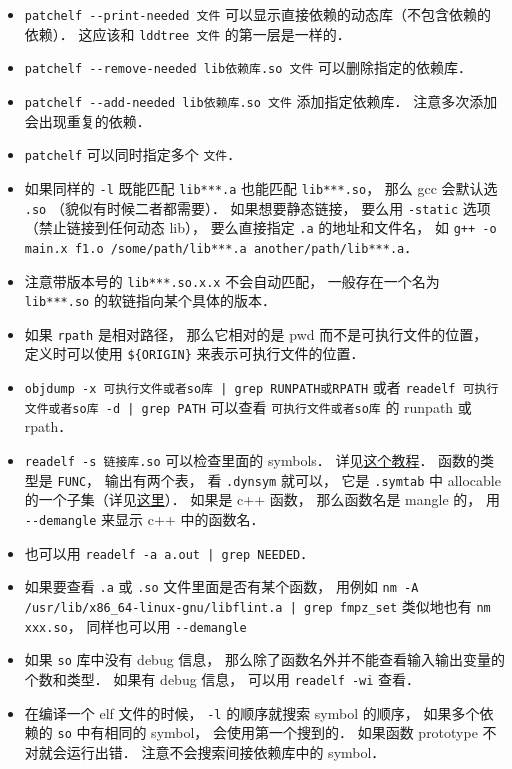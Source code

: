 \begin{itemize}
\item \verb|patchelf --print-needed 文件| 可以显示直接依赖的动态库（不包含依赖的依赖）． 这应该和 \verb|lddtree 文件| 的第一层是一样的．
\item \verb|patchelf --remove-needed lib依赖库.so 文件| 可以删除指定的依赖库．
\item \verb|patchelf --add-needed lib依赖库.so 文件| 添加指定依赖库． 注意多次添加会出现重复的依赖．
\item \verb|patchelf| 可以同时指定多个 \verb|文件|．
\item 如果同样的 \verb`-l` 既能匹配 \verb`lib***.a` 也能匹配 \verb`lib***.so`， 那么 gcc 会默认选 \verb`.so` （貌似有时候二者都需要）． 如果想要静态链接， 要么用 \verb`-static` 选项（禁止链接到任何动态 lib）， 要么直接指定 \verb`.a` 的地址和文件名， 如 \verb`g++ -o main.x f1.o /some/path/lib***.a another/path/lib***.a`．
\item 注意带版本号的 \verb|lib***.so.x.x| 不会自动匹配， 一般存在一个名为 \verb|lib***.so| 的软链指向某个具体的版本．
\item 如果 \verb|rpath| 是相对路径， 那么它相对的是 pwd 而不是可执行文件的位置， 定义时可以使用 \verb|${ORIGIN}| 来表示可执行文件的位置．
\item \verb`objdump -x 可执行文件或者so库 | grep RUNPATH或RPATH` 或者 \verb`readelf 可执行文件或者so库 -d | grep PATH` 可以查看 \verb|可执行文件或者so库| 的 runpath 或 rpath．
\item \verb|readelf -s 链接库.so| 可以检查里面的 symbols． 详见\href{https://amir.rachum.com/blog/2016/09/17/shared-libraries/}{这个教程}． 函数的类型是 \verb|FUNC|， 输出有两个表， 看 \verb|.dynsym| 就可以， 它是 \verb|.symtab| 中 allocable 的一个子集（详见\href{https://blogs.oracle.com/solaris/post/inside-elf-symbol-tables}{这里}）． 如果是 c++ 函数， 那么函数名是 mangle 的， 用 \verb|--demangle| 来显示 c++ 中的函数名．
\item 也可以用 \verb`readelf -a a.out | grep NEEDED`．
\item 如果要查看 \verb|.a| 或 \verb|.so| 文件里面是否有某个函数， 用例如 \verb`nm -A /usr/lib/x86_64-linux-gnu/libflint.a | grep fmpz_set` 类似地也有 \verb|nm xxx.so|， 同样也可以用 \verb|--demangle|
\item 如果 \verb|so| 库中没有 debug 信息， 那么除了函数名外并不能查看输入输出变量的个数和类型． 如果有 debug 信息， 可以用 \verb|readelf -wi| 查看．
\item 在编译一个 elf 文件的时候， \verb|-l| 的顺序就搜索 symbol 的顺序， 如果多个依赖的 \verb|so| 中有相同的 symbol， 会使用第一个搜到的． 如果函数 prototype 不对就会运行出错． 注意不会搜索间接依赖库中的 symbol．
\end{itemize}

